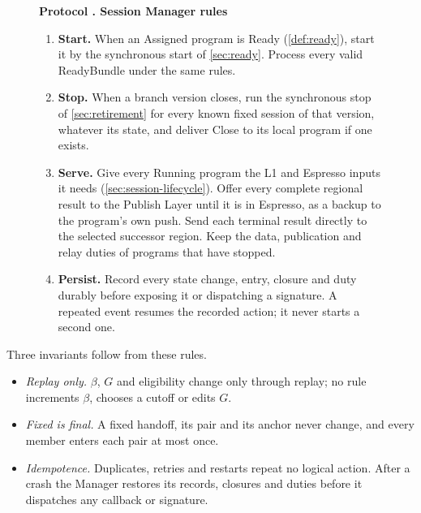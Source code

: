 \documentclass[11pt,a4paper]{article}
\newcommand{\tagg}[1]{\ensuremath{\mathsf{#1}}}
\newcounter{protocol}
\newenvironment{protocol}[3][htbp]{\begin{figure}[#1]\refstepcounter{protocol}\label{#2}
\begin{mdframed}[linewidth=.6pt,skipabove=0pt,skipbelow=0pt,
innertopmargin=7pt,innerbottommargin=7pt]\small
\textbf{Protocol \theprotocol. #3}\par\smallskip}{\end{mdframed}\end{figure}}
\begin{document}
\begin{protocol}[H]{alg:rotation}{Session Manager rules}
\begin{enumerate}[label=\textbf{\arabic*)},itemsep=3pt]
\begin{enumerate}[label=(\alph*),itemsep=2pt]
 $\tagg{AUTH}_{r+1,0}$ returns the node's region. The session id is
 $(\beta,r+1)$, the anchor is $T_{\beta,r}$, and
 $q^{\rm open}_{\beta,r+1}=q_s$. This case does not wait for
 $T_{\beta,r}$ to enter $G$; if $J_{q_0}$ is not yet final at the node,
 it waits for that header.
 \end{enumerate}
 In both cases the authority is $\tagg{AUTH}_{r,0}$ of the new turn
 index $r$, and $\lambda^{\rm open}$ is the larger of the anchor's L1
 reference height and that authority's publication height. Verify the
 handoff with \tagg{VerifyHandoffHistory} (\cref{sec:verify-handoff})
 and record it in the program table. Each pair is assigned at most once;
 a different handoff for an assigned pair is rejected. The genesis
 session is assigned when $\mathcal V_G$ has
 $\mathsf{Tail}=\tagg{NEXT}(\nu)$ with cause \tagg{GENESIS} and
 $i(\nu)$ equal to the node's region. A
 verified ReadyBundle for a pair the node has not yet assigned assigns
 it in the same way and then enters at once (\cref{sec:ready}).
\item \textbf{Start.} When an Assigned program is Ready
(\cref{def:ready}), start it by the synchronous start of
\cref{sec:ready}. Process every valid ReadyBundle under the same rules.
\item \textbf{Stop.} When a branch version closes, run the synchronous
stop of \cref{sec:retirement} for every known fixed session of that
version, whatever its state, and deliver Close to its local program if
one exists.
\item \textbf{Serve.} Give every Running program the L1 and Espresso
inputs it needs (\cref{sec:session-lifecycle}). Offer every complete
regional result to the Publish Layer until it is in Espresso, as a
backup to the program's own push. Send each terminal result directly to
the selected successor region. Keep the data, publication and relay
duties of programs that have stopped.
\item \textbf{Persist.} Record every state change, entry, closure and
duty durably before exposing it or dispatching a signature. A repeated
event resumes the recorded action; it never starts a second one.
\end{enumerate}
\end{protocol}

Three invariants follow from these rules.
\begin{itemize}
\item \emph{Replay only.} $\beta$, $G$ and eligibility change only
through replay; no rule increments $\beta$, chooses a cutoff or edits $G$.
\item \emph{Fixed is final.} A fixed handoff, its pair and its anchor
never change, and every member enters each pair at most once.
\item \emph{Idempotence.} Duplicates, retries and restarts repeat no
logical action. After a crash the Manager restores its records,
closures and duties before it dispatches any callback or signature.
\end{itemize}
\end{document}
